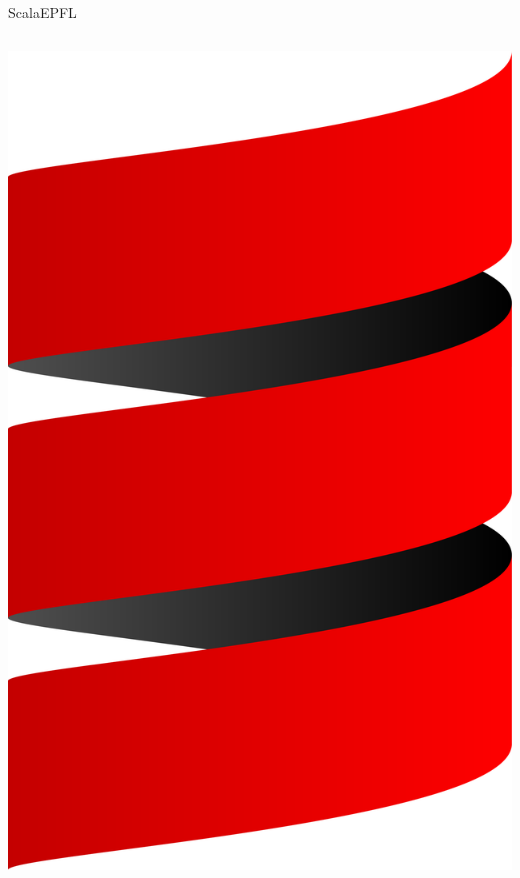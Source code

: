 \documentclass[aspectratio=169]{beamer}
\begin{document}
\begin{frame}{Scala}{EPFL}
\begin{columns}
    \centering\includegraphics[height=0.7\textheight]{scala-logo.pdf}
  \end{columns}
\end{frame}
\end{document}
